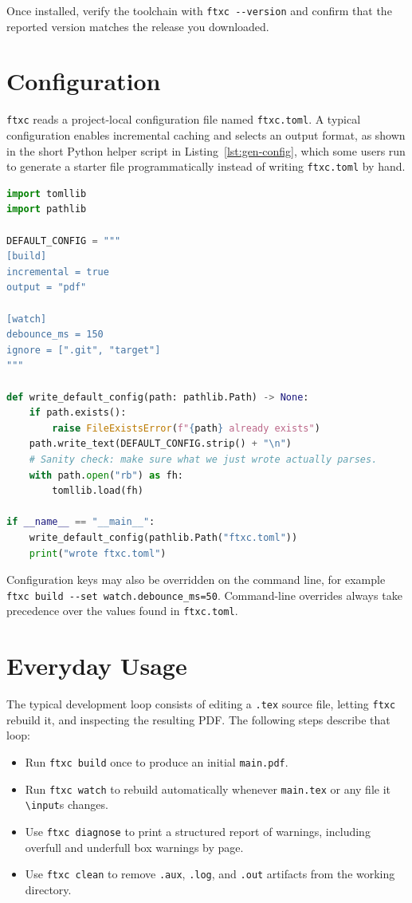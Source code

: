 \documentclass[11pt]{article}
\begin{document}
Once installed, verify the toolchain with \lstinline|ftxc --version| and
confirm that the reported version matches the release you downloaded.

\section{Configuration}

\texttt{ftxc} reads a project-local configuration file named
\texttt{ftxc.toml}. A typical configuration enables incremental caching and
selects an output format, as shown in the short Python helper script in
Listing~\ref{lst:gen-config}, which some users run to generate a starter
file programmatically instead of writing \texttt{ftxc.toml} by hand.

\begin{lstlisting}[language=Python,caption={Generating a starter \texttt{ftxc.toml}},label={lst:gen-config}]
import tomllib
import pathlib

DEFAULT_CONFIG = """
[build]
incremental = true
output = "pdf"

[watch]
debounce_ms = 150
ignore = [".git", "target"]
"""

def write_default_config(path: pathlib.Path) -> None:
    if path.exists():
        raise FileExistsError(f"{path} already exists")
    path.write_text(DEFAULT_CONFIG.strip() + "\n")
    # Sanity check: make sure what we just wrote actually parses.
    with path.open("rb") as fh:
        tomllib.load(fh)

if __name__ == "__main__":
    write_default_config(pathlib.Path("ftxc.toml"))
    print("wrote ftxc.toml")
\end{lstlisting}

Configuration keys may also be overridden on the command line, for example
\lstinline|ftxc build --set watch.debounce_ms=50|. Command-line overrides
always take precedence over the values found in \texttt{ftxc.toml}.

\section{Everyday Usage}

The typical development loop consists of editing a \texttt{.tex} source
file, letting \texttt{ftxc} rebuild it, and inspecting the resulting PDF.
The following steps describe that loop:

\begin{itemize}
  \item Run \texttt{ftxc build} once to produce an initial \texttt{main.pdf}.
  \item Run \texttt{ftxc watch} to rebuild automatically whenever
        \texttt{main.tex} or any file it \texttt{\textbackslash input}s changes.
  \item Use \texttt{ftxc diagnose} to print a structured report of warnings,
        including overfull and underfull box warnings by page.
  \item Use \texttt{ftxc clean} to remove \texttt{.aux}, \texttt{.log}, and
        \texttt{.out} artifacts from the working directory.
\end{itemize}
\end{document}
